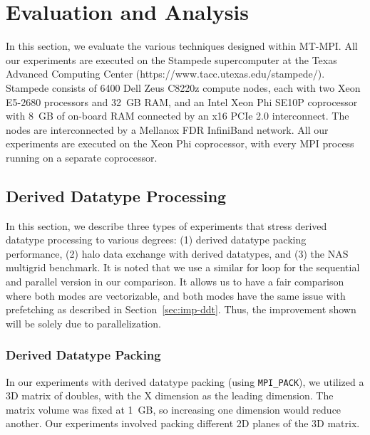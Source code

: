 \section{Evaluation and Analysis}\label{sec:mtmpi-eva}

In this section, we evaluate the various techniques designed within
MT-MPI.  All our experiments are executed on the Stam\-pede
supercomputer at the Texas Advanced Computing Center
(https://www.tacc.utexas.edu/stampede/). S\-tampede consists of 6400
Dell Zeus C8220z compute nodes, each with two Xeon E5-2680 processors
and 32~GB RAM, and an Intel Xeon Phi SE10P coprocessor with 8~GB of
on-board RAM connected by an x16 PCIe 2.0 interconnect.  The nodes are
interconnected by a Mellanox FDR InfiniBand network.  All our
experiments are executed on the Xeon Phi coprocessor, with every MPI
process running on a separate coprocessor.


\subsection{Derived Datatype Processing}\label{sec:eva-ddt}

In this section, we describe three types of experiments that stress
derived datatype processing to various degrees: (1) derived datatype
packing performance, (2) halo data exchange with derived datatypes,
and (3) the NAS multigrid benchmark. It is noted that we use a similar
for loop for the sequential and parallel version in our comparison. It
allows us to have a fair comparison where both modes are vectorizable,
and both modes have the same issue with prefetching as described in
Section~\ref{sec:imp-ddt}. Thus, the improvement shown will be solely
due to parallelization.

\subsubsection{Derived Datatype Packing}

In our experiments with derived datatype packing (using
\texttt{MPI\_PACK}), we utilized a 3D matrix of doubles, with the X
dimension as the leading dimension.  The matrix volume was fixed at
1~GB, so increasing one dimension would reduce another.  Our
experiments involved packing different 2D planes of the 3D matrix.

